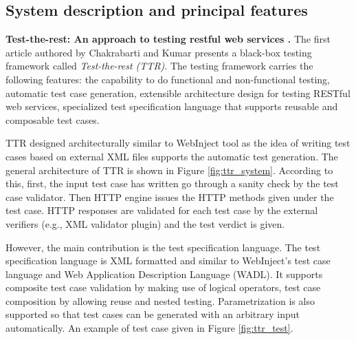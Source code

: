 \documentclass[english]{tktltiki}
\begin{document}
\subsection{System description and principal features}
\textbf{Test-the-rest: An approach to testing restful web services \cite{chakrabarti2009test}.} The first article authored by Chakrabarti and Kumar \cite{chakrabarti2009test} presents a black-box testing framework called \textit{Test-the-rest (TTR)}. The testing framework carries the following features: the capability to do functional and non-functional testing, automatic test case generation, extensible architecture design for testing RESTful web services, specialized test specification language that supports reusable and composable test cases.

TTR designed architecturally similar to WebInject \cite{webinject} tool as the idea of writing test cases based on external XML files supports the automatic test generation. The general architecture of TTR is shown in Figure \ref{fig:ttr_system}. According to this, first, the input test case has written go through a sanity check by the test case validator. Then HTTP engine issues the HTTP methods given under the test case. HTTP responses are validated for each test case by the external verifiers (e.g., XML validator plugin) and the test verdict is given. 

However, the main contribution is the test specification language. The test specification language is XML formatted and similar to WebInject's test case language and Web Application Description Language (WADL). It supports composite test case validation by making use of logical operators, test case composition by allowing reuse and nested testing. Parametrization is also supported so that test cases can be generated with an arbitrary input automatically. An example of test case given in Figure \ref{fig:ttr_test}.
\end{document}
